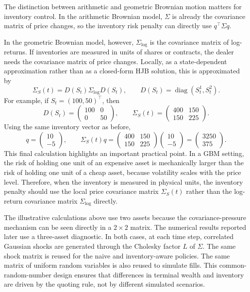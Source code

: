 \documentclass[a4paper,10pt,titlepage,oneside,openany]{book}
\theoremstyle{plain}\newtheorem{theorem}{Theorem}[chapter]
\theoremstyle{definition}\newtheorem{definition}{Definition}[chapter]
\theoremstyle{remark}\newtheorem{remark}{Remark}[chapter]
\begin{document}
The distinction between arithmetic and geometric Brownian motion matters for inventory control. In the arithmetic Brownian model, $\Sigma$ is already the covariance matrix of price changes, so the inventory risk penalty can directly use $q^\top\Sigma q$.

In the geometric Brownian model, however, $\Sigma_{\log}$ is the covariance matrix of log-returns. If inventories are measured in units of shares or contracts, the dealer needs the covariance matrix of price changes. Locally, as a state-dependent approximation rather than as a closed-form HJB solution, this is approximated by
\[
\Sigma_S(t)
=
D(S_t)\Sigma_{\log}D(S_t),
\qquad
D(S_t)=\operatorname{diag}(S_t^1,S_t^2).
\]
For example, if $S_t=(100,50)^\top$, then
\[
D(S_t)=
\begin{pmatrix}
100 & 0\\
0 & 50
\end{pmatrix},
\qquad
\Sigma_S(t)
=
\begin{pmatrix}
400 & 150\\
150 & 225
\end{pmatrix}.
\]
Using the same inventory vector as before,
\[
q=
\begin{pmatrix}
10\\
-5
\end{pmatrix},
\qquad
\Sigma_S(t)q
=
\begin{pmatrix}
400 & 150\\
150 & 225
\end{pmatrix}
\begin{pmatrix}
10\\
-5
\end{pmatrix}
=
\begin{pmatrix}
3250\\
375
\end{pmatrix}.
\]
This final calculation highlights an important practical point. In a GBM setting, the risk of holding one unit of an expensive asset is mechanically larger than the risk of holding one unit of a cheap asset, because volatility scales with the price level. Therefore, when the inventory is measured in physical units, the inventory penalty should use the local price covariance matrix $\Sigma_S(t)$ rather than the log-return covariance matrix $\Sigma_{\log}$ directly.

The illustrative calculations above use two assets because the covariance-pressure mechanism can be seen directly in a $2\times 2$ matrix. The numerical results reported later use a three-asset diagnostic. In both cases, at each time step, correlated Gaussian shocks are generated through the Cholesky factor $L$ of $\Sigma$. The same shock matrix is reused for the naive and inventory-aware policies. The same matrix of uniform random variables is also reused to simulate fills. This common-random-number design ensures that differences in terminal wealth and inventory are driven by the quoting rule, not by different simulated scenarios.
\end{document}
